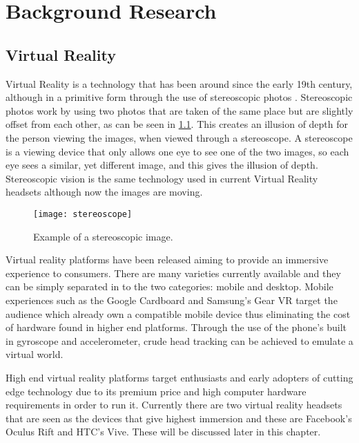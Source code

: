 \chapter{Background Research}
\label{chapter2}


\section{Virtual Reality}
	Virtual Reality is a technology that has been around since the early 19th century, although in a primitive form through the use of stereoscopic photos \cite{stereoscopy}. Stereoscopic photos work by using two photos that are taken of the same place but are slightly offset from each other, as can be seen in \ref{fig:stereoscope1}. This creates an illusion of depth for the person viewing the images, when viewed through a stereoscope. A stereoscope is a viewing device that only allows one eye to see one of the two images, so each eye sees a similar, yet different image, and this gives the illusion of depth. Stereoscopic vision is the same technology used in current Virtual Reality headsets although now the images are moving.\\


\begin{figure}[H]
	\texttt{[image: stereoscope]}
	\centering
	\caption{Example of a stereoscopic image.}
	\label{fig:stereoscope1}
\end{figure}

Virtual reality platforms have been released aiming to provide an immersive experience to consumers. There are many varieties currently available and they can be simply separated in to the two categories: mobile and desktop. Mobile experiences such as the Google Cardboard and Samsung's Gear VR target the audience which already own a compatible mobile device thus eliminating the cost of hardware found in higher end platforms. Through the use of the phone's built in gyroscope and accelerometer, crude head tracking can be achieved to emulate a virtual world.

High end virtual reality platforms target enthusiasts and early adopters of cutting edge technology due to its premium price and high computer hardware requirements in order to run it. Currently there are two virtual reality headsets that are seen as the devices that give highest immersion and these are Facebook's Oculus Rift and HTC's Vive. These will be discussed later in this chapter.

